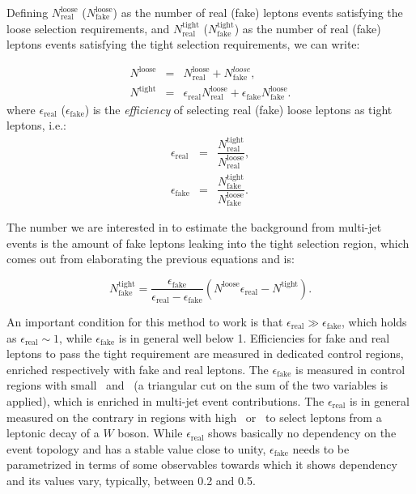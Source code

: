 Defining $N^\mathrm{loose}_\mathrm{real}$ ($N^\mathrm{loose}_\mathrm{fake}$) as the number of
real (fake) leptons events satisfying the loose selection requirements, and
$N^\mathrm{tight}_\mathrm{real}$ ($N^\mathrm{tight}_\mathrm{fake}$) as the number of
real (fake) leptons events satisfying the tight selection requirements, we can write:

\begin{eqnarray}
\label{eqn:intro-mm-Nloose}
N^\mathrm{loose} & = & N^\mathrm{loose}_\mathrm{real} + N^{loose}_\mathrm{fake}, \\
\label{eqn:intro-mm-Ntight}
N^\mathrm{tight} & = & \epsilon_\mathrm{real}N^\mathrm{loose}_\mathrm{real} + \epsilon_\mathrm{fake}N^\mathrm{loose}_\mathrm{fake}.
\end{eqnarray}
where $\epsilon_\mathrm{real}$ ($\epsilon_\mathrm{fake}$) is the 
{\it efficiency} of selecting real (fake) loose leptons as tight leptons, i.e.:
\begin{eqnarray}
\label{eqn:intro-mm-real}
\epsilon_\mathrm{real} & = & \dfrac{N^\mathrm{tight}_\mathrm{real}}{N^\mathrm{loose}_\mathrm{real}}, \\
\label{eqn:intro-mm-fake}
\epsilon_\mathrm{fake} & = & \dfrac{N^\mathrm{tight}_\mathrm{fake}}{N^\mathrm{loose}_\mathrm{fake}}.
\end{eqnarray}


The number we are interested in to estimate the background from
multi-jet events is the amount of fake leptons leaking into the 
tight selection region, which comes out from elaborating
the previous equations and is:

\begin{equation}
N^\mathrm{tight}_\mathrm{fake} = \frac{\epsilon_\mathrm{fake}}{\epsilon_\mathrm{real} - \epsilon_\mathrm{fake}}(N^\mathrm{loose} \epsilon_\mathrm{real} - N^\mathrm{tight}).
\label{eqn:intro-mm-tight_fake}
\end{equation}

An important condition for this method to work is that 
$\epsilon_\mathrm{real} \gg \epsilon_\mathrm{fake}$, which 
holds as $\epsilon_\mathrm{real}\sim 1$, while $\epsilon_\mathrm{fake}$
is in general well below 1.
Efficiencies for fake and real leptons to pass the 
tight requirement are measured in dedicated control regions, 
enriched respectively with fake and real leptons.
The $\epsilon_\mathrm{fake}$ is measured in control regions
with small \met\ and \mtw\ (a triangular cut on the
sum of the two variables is applied), which is
enriched in multi-jet event contributions.
The $\epsilon_\mathrm{real}$ is in general measured 
on the contrary in regions with high \met\ or \mtw\
to select leptons from a leptonic decay of a $W$
boson.
While $\epsilon_\mathrm{real}$ shows basically
no dependency on the event topology and has
a stable value close to unity,  $\epsilon_\mathrm{fake}$ 
needs to be parametrized in terms of some observables
towards which it shows dependency and its values
vary, typically, between 0.2 and 0.5.

